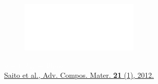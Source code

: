 \documentclass[first,firstsupp,lastsupp,last,hyperref,table]{ETHclass}
\begin{document}
\begin{frame}
\begin{figure}
\centering
\includegraphics[width=0.5\textwidth]{saito-fill.png}
\end{figure}
\vspace{-0.25cm}
\textcolor{white}{$n=1$, $t_{90^{\circ}}=40\mu m$}\\\vspace{5pt}
\pgfmathsetmacro{}
\pgfmathsetmacro{}
{\fontsize{\fontsizeref}{\stretchref} \selectfont \href{https://doi.org/10.1163/156855112X629522}{Saito et al., Adv. Compos. Mater. \textbf{21} (1), 2012.}}
\end{frame}

\addtocounter{framenumber}{-1}
\end{document}
